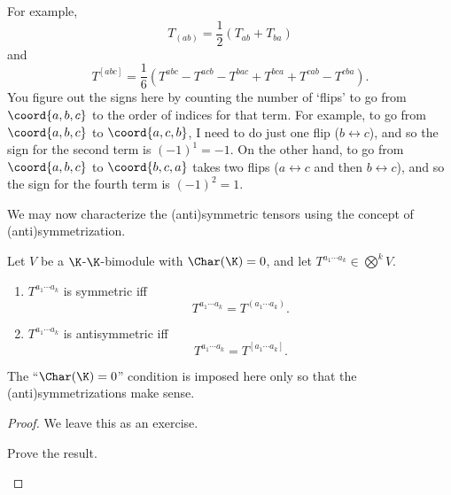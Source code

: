 \begin{exm}{}{}
	For example,
	\begin{equation}
		T_{(ab)}=\frac{1}{2}(T_{ab}+T_{ba})
	\end{equation}
	and
	\begin{equation*}
		T^{[abc]}=\frac{1}{6}(T^{abc}-T^{acb}-T^{bac}+T^{bca}+T^{cab}-T^{cba}).
	\end{equation*}
	You figure out the signs here by counting the number of `flips' to go from $\coord{a,b,c}$ to the order of indices for that term.  For example, to go from $\coord{a,b,c}$ to $\coord{a,c,b}$, I need to do just one flip ($b\leftrightarrow c$), and so the sign for the second term is $(-1)^1=-1$.  On the other hand, to go from $\coord{a,b,c}$ to $\coord{b,c,a}$ takes two flips ($a\leftrightarrow c$ and then $b\leftrightarrow c$), and so the sign for the fourth term is $(-1)^2=1$.
\end{exm}
We may now characterize the (anti)symmetric tensors using the concept of (anti)symmetrization.
\begin{prp}{}{}
	Let $V$ be a $\K$-$\K$-bimodule with $\Char (\K )=0$, and let $T^{a_1\cdots a_k}\in \bigotimes ^kV$.
	\begin{enumerate}
		\item $T^{a_1\cdots a_k}$ is symmetric iff
		\begin{equation}
			T^{a_1\cdots a_k}=T^{(a_1\cdots a_k)}.
		\end{equation}
		\item $T^{a_1\cdots a_k}$ is antisymmetric iff
		\begin{equation}
			T^{a_1\cdots a_k}=T^{[a_1\cdots a_k]}.
		\end{equation}
	\end{enumerate}
	\begin{rmk}
		The ``$\Char (\K )=0$'' condition is imposed here only so that the (anti)symmetrizations make sense.
	\end{rmk}
	\begin{proof}
		We leave this as an exercise.
		\begin{exr}[breakable=false]{}{}
			Prove the result.
		\end{exr}
	\end{proof}
\end{prp}
